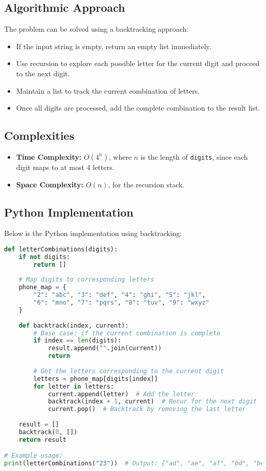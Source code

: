 \subsection*{Algorithmic Approach}
The problem can be solved using a backtracking approach:
\begin{itemize}
    \item If the input string is empty, return an empty list immediately.
    \item Use recursion to explore each possible letter for the current digit and proceed to the next digit.
    \item Maintain a list to track the current combination of letters.
    \item Once all digits are processed, add the complete combination to the result list.
\end{itemize}

\subsection*{Complexities}
\begin{itemize}
    \item \textbf{Time Complexity:} \(O(4^n)\), where \(n\) is the length of \texttt{digits}, since each digit maps to at most 4 letters.
    \item \textbf{Space Complexity:} \(O(n)\), for the recursion stack.
\end{itemize}

\subsection*{Python Implementation}
Below is the Python implementation using backtracking:

\begin{fullwidth}
\begin{lstlisting}[language=Python]
def letterCombinations(digits):
    if not digits:
        return []
    
    # Map digits to corresponding letters
    phone_map = {
        "2": "abc", "3": "def", "4": "ghi", "5": "jkl",
        "6": "mno", "7": "pqrs", "8": "tuv", "9": "wxyz"
    }
    
    def backtrack(index, current):
        # Base case: if the current combination is complete
        if index == len(digits):
            result.append("".join(current))
            return
        
        # Get the letters corresponding to the current digit
        letters = phone_map[digits[index]]
        for letter in letters:
            current.append(letter)  # Add the letter
            backtrack(index + 1, current)  # Recur for the next digit
            current.pop()  # Backtrack by removing the last letter
    
    result = []
    backtrack(0, [])
    return result

# Example usage:
print(letterCombinations("23"))  # Output: ["ad", "ae", "af", "bd", "be", "bf", "cd", "ce", "cf"]
\end{lstlisting}
\end{fullwidth}

